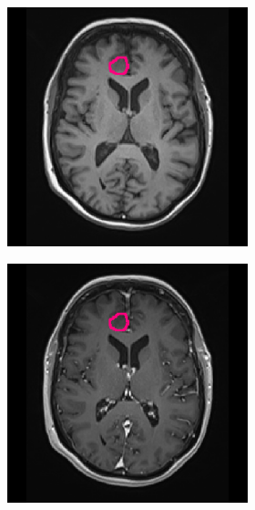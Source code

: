 \begin{subappendices}
\begin{figure}[htbp]
\begin{subfigure}[b]{0.95\textwidth}
\begin{subfigure}[b]{0.215\textwidth}
        \includegraphics[width=\textwidth, clip, trim=2.5cm 0.5cm 2.5cm 0.5cm]{Figures/Random_segs/T1_TCGA-FG-A713.png}
        \end{subfigure}
        \hfill
        \begin{subfigure}[b]{0.215\textwidth}
        \includegraphics[width=\textwidth, clip, trim=2.5cm 0.5cm 2.5cm 0.5cm]{Figures/Random_segs/T1GD_TCGA-FG-A713.png}

\end{subfigure}
\end{subfigure}
\end{figure}
\end{subappendices}
